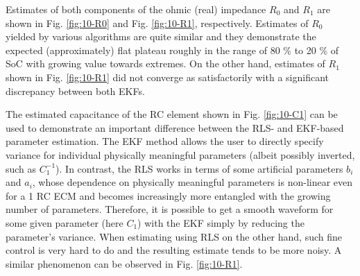 Estimates of both components of the ohmic (real) impedance $R_0$ and $R_1$ are shown in Fig. \ref{fig:10-R0} and Fig. \ref{fig:10-R1}, respectively. Estimates of $R_0$ yielded by various algorithms are quite similar and they demonstrate the expected (approximately) flat plateau roughly in the range of 80 \% to 20 \% of SoC with growing value towards extremes. On the other hand, estimates of $R_1$ shown in Fig. \ref{fig:10-R1} did not converge as satisfactorily with a significant discrepancy between both EKFs.

The estimated capacitance of the RC element shown in Fig. \ref{fig:10-C1} can be used to demonstrate an important difference between the RLS- and EKF-based parameter estimation. The EKF method allows the user to directly specify variance for individual physically meaningful parameters (albeit possibly inverted, such as $C_1^{-1}$). In contrast, the RLS works in terms of some artificial parameters $b_i$ and $a_i$, whose dependence on physically meaningful parameters is non-linear even for a 1 RC ECM and becomes increasingly more entangled with the growing number of parameters. Therefore, it is possible to get a smooth waveform for some given parameter (here $C_1$) with the EKF simply by reducing the parameter's variance. When estimating using RLS on the other hand, such fine control is very hard to do and the resulting estimate tends to be more noisy. A similar phenomenon can be observed in Fig. \ref{fig:10-R1}.

